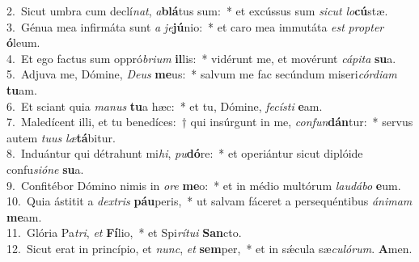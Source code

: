 {2.~}Sicut umbra cum declí\textit{nat}, \textit{a}\textbf{blá}tus sum:~* et excússus sum \textit{si}\textit{cut} \textit{lo}\textbf{cú}stæ.\\
{3.~}Génua mea infirmáta sunt \textit{a} \textit{je}\textbf{jú}nio:~* et caro mea immutáta \textit{est} \textit{prop}\textit{ter} \textbf{ó}leum.\\
{4.~}Et ego factus sum oppró\textit{bri}\textit{um} \textbf{il}lis:~* vidérunt me, et movérunt \textit{cá}\textit{pi}\textit{ta} \textbf{su}a.\\
{5.~}Adjuva me, Dómine, \textit{De}\textit{us} \textbf{me}us:~* salvum me fac secúndum miseri\textit{cór}\textit{di}\textit{am} \textbf{tu}am.\\
{6.~}Et sciant quia \textit{ma}\textit{nus} \textbf{tu}a hæc:~* et tu, Dómine, \textit{fe}\textit{cí}\textit{sti} \textbf{e}am.\\
{7.~}Maledícent illi, et tu benedíces:~† qui insúrgunt in me, \textit{con}\textit{fun}\textbf{dán}tur:~* servus autem \textit{tu}\textit{us} \textit{læ}\textbf{tá}bitur.\\
{8.~}Induántur qui détrahunt mi\textit{hi}, \textit{pu}\textbf{dó}re:~* et operiántur sicut diplóide confu\textit{si}\textit{ó}\textit{ne} \textbf{su}a.\\
{9.~}Confitébor Dómino nimis in \textit{o}\textit{re} \textbf{me}o:~* et in médio multórum \textit{lau}\textit{dá}\textit{bo} \textbf{e}um.\\
{10.~}Quia ástitit a \textit{dex}\textit{tris} \textbf{páu}peris,~* ut salvam fáceret a persequéntibus \textit{á}\textit{ni}\textit{mam} \textbf{me}am.\\
{11.~}Glória Pa\textit{tri}, \textit{et} \textbf{Fí}lio,~* et Spi\textit{rí}\textit{tu}\textit{i} \textbf{San}cto.\\
{12.~}Sicut erat in princípio, et \textit{nunc}, \textit{et} \textbf{sem}per,~* et in sǽcula sæ\textit{cu}\textit{ló}\textit{rum}. \textbf{A}men.\\
